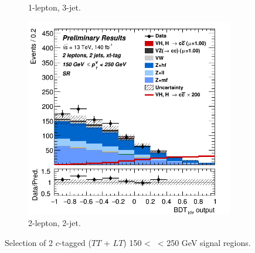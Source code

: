 \begin{figure}[h!]
\begin{subfigure}[b]{0.32\textwidth}
      \caption{1-lepton, 3-jet.}
      \label{fig:plots_VHcc_ex_1L_SR_2C}
  \end{subfigure}
  \begin{subfigure}[b]{0.32\textwidth}
    \centering
    \includegraphics[width=\textwidth]{Images/VH/Own_fit/prefit_VHcc/Region_distmva_BMax250_BMin150_DSR_J2_TTypext_T2_L2_Y6051_Prefit.png}
    \caption{2-lepton, 2-jet.}
    \label{fig:plots_VHcc_ex_2L_SR_2C}
\end{subfigure}
  \caption{Selection of 2 $c$-tagged ($TT$ + $LT$) 150 < \ptv\ < 250 GeV signal regions.}
  \label{fig:plots_VHcc_ex_SR_2C}
\end{figure} 



